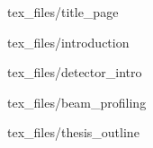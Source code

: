 \documentclass[a4paper,10pt]{article}
\begin{document}
{tex_files/title_page}
\clearpage

\newpage
\tableofcontents
{}
\newpage
{}
\setcounter{page}{2}

{tex_files/introduction}

{tex_files/detector_intro}

{tex_files/beam_profiling}

{tex_files/thesis_outline}
\end{document}
